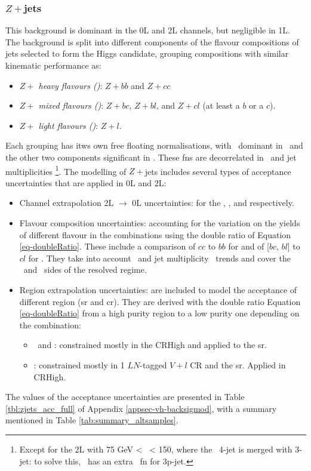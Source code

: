 \subsubsection{$Z+$jets}
This background is dominant in the 0L and 2L channels, but negligible in 1L. The background is split into different components of the flavour compositions of jets selected to form the Higgs candidate, grouping compositions with similar kinematic performance as:   
\begin{itemize}
    \item \textit{$Z+$ heavy flavours (\zhf)}: $Z+bb$ and $Z+cc$
    \item \textit{$Z+$ mixed flavours (\zmf)}: $Z+bc$, $Z+bl$, and $Z+cl$ (at least a $b$ or a $c$).
    \item \textit{$Z+$ light flavours (\zlf)}: $Z+l$.
\end{itemize}
Each grouping has itws own free floating normalisations, with \zhf\ dominant in \vhb\ and the other two components significant in \vhc. These \gls{fn}s are decorrelated in \ptv\ and jet multiplicities \nj\footnote{Except for the 2L with 75 GeV < \ptv\ < 150, where the \Vhb\ 4-jet is merged with 3-jet: to solve this, \vhb\ has an extra \vhf\ \gls{fn} for 3p-jet.}. The modelling of $Z+$jets includes several types of acceptance uncertainties that are applied in 0L and 2L:
\begin{itemize}[leftmargin=*]
    \item Channel extrapolation 2L $\rightarrow$ 0L uncertainties: for the \zhf, \zmf, and \zlf respectively. 
    \item Flavour composition uncertainties: accounting for the variation on the yields of different flavour in the combinations using the double ratio of Equation \ref{eq-doubleRatio}. These include a comparison of $cc$ to $bb$ for \zhf and of [$bc$, $bl$] to $cl$ for \zmf. They take into account \ptv\ and jet multiplicity \nj\ trends and cover the \vhb\ and \vhc\ sides of the resolved regime. 
    \item Region extrapolation uncertainties: are included to model the acceptance of different region (\gls{sr} and \gls{cr}). They are derived with the double ratio Equation \ref{eq-doubleRatio} from a high purity region to a low purity one depending on the combination:
    \begin{itemize}
        \item \zhf\ and \zmf: constrained mostly in the CRHigh and applied to the \gls{sr}. 
        \item \zlf: constrained mostly in 1 $LN$-tagged $V+l$ CR and the \gls{sr}. Applied in CRHigh. %
    \end{itemize}
\end{itemize}
The values of the acceptance uncertainties are presented in Table \ref{tbl:zjets_acc_full} of Appendix \ref{appsec-vh-backsigmod}, with a summary mentioned in Table \ref{tab:summary_altsamples}.

